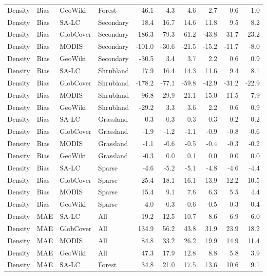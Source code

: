 \begin{longtable}{llllrrrrrr}
  Density & Bias & GeoWiki & Forest & -46.1 & 4.3 & 4.6 & 2.7 & 0.6 & 1.0 \\ 
  Density & Bias & SA-LC & Secondary & 18.4 & 16.7 & 14.6 & 11.8 & 9.5 & 8.2 \\ 
  Density & Bias & GlobCover & Secondary & -186.3 & -79.3 & -61.2 & -43.8 & -31.7 & -23.2 \\ 
  Density & Bias & MODIS & Secondary & -101.0 & -30.6 & -21.5 & -15.2 & -11.7 & -8.0 \\ 
  Density & Bias & GeoWiki & Secondary & -30.5 & 3.4 & 3.7 & 2.2 & 0.6 & 0.9 \\ 
  Density & Bias & SA-LC & Shrubland & 17.9 & 16.4 & 14.3 & 11.6 & 9.4 & 8.1 \\ 
  Density & Bias & GlobCover & Shrubland & -178.2 & -77.1 & -59.8 & -42.9 & -31.2 & -22.9 \\ 
  Density & Bias & MODIS & Shrubland & -96.8 & -29.9 & -21.1 & -15.0 & -11.5 & -7.9 \\ 
  Density & Bias & GeoWiki & Shrubland & -29.2 & 3.3 & 3.6 & 2.2 & 0.6 & 0.9 \\ 
  Density & Bias & SA-LC & Grassland & 0.3 & 0.3 & 0.3 & 0.3 & 0.2 & 0.2 \\ 
  Density & Bias & GlobCover & Grassland & -1.9 & -1.2 & -1.1 & -0.9 & -0.8 & -0.6 \\ 
  Density & Bias & MODIS & Grassland & -1.1 & -0.6 & -0.5 & -0.4 & -0.3 & -0.2 \\ 
  Density & Bias & GeoWiki & Grassland & -0.3 & 0.0 & 0.1 & 0.0 & 0.0 & 0.0 \\ 
  Density & Bias & SA-LC & Sparse & -4.6 & -5.2 & -5.1 & -4.8 & -4.6 & -4.4 \\ 
  Density & Bias & GlobCover & Sparse & 25.4 & 18.1 & 16.1 & 13.9 & 12.2 & 10.5 \\ 
  Density & Bias & MODIS & Sparse & 15.4 & 9.1 & 7.6 & 6.3 & 5.5 & 4.4 \\ 
  Density & Bias & GeoWiki & Sparse & 4.0 & -0.3 & -0.6 & -0.5 & -0.3 & -0.4 \\ 
  Density & MAE & SA-LC & All & 19.2 & 12.5 & 10.7 & 8.6 & 6.9 & 6.0 \\ 
  Density & MAE & GlobCover & All & 134.9 & 56.2 & 43.8 & 31.9 & 23.9 & 18.2 \\ 
  Density & MAE & MODIS & All & 84.8 & 33.2 & 26.2 & 19.9 & 14.9 & 11.4 \\ 
  Density & MAE & GeoWiki & All & 47.3 & 17.9 & 12.8 & 8.8 & 5.8 & 3.9 \\ 
  Density & MAE & SA-LC & Forest & 34.8 & 21.0 & 17.5 & 13.6 & 10.6 & 9.1 \\ 

\end{longtable}

